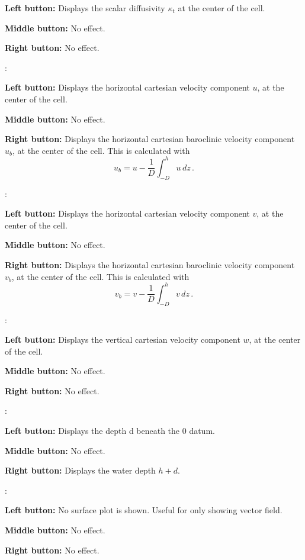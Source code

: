 \documentclass[12pt,oneside]{article}
\begin{document}
\begin{list}{}
\begin{list}{}
\item {\bf Left button:} Displays the scalar diffusivity $\kappa_t$ at the center of the cell.
\item {\bf Middle button:} No effect.
\item {\bf Right button:} No effect.
\end{list}
\item {}: 
\begin{list}{}
\item {\bf Left button:} Displays the horizontal cartesian velocity component $u$, at the center of the cell.
\item {\bf Middle button:} No effect.
\item {\bf Right button:} Displays the horizontal cartesian baroclinic velocity component $u_b$, at the center of the cell.
This is calculated with
\[
u_b = u - \frac{1}{D}\int_{-D}^h u\,dz\,.
\]
\end{list}
\item {}: 
\begin{list}{}
\item {\bf Left button:} Displays the horizontal cartesian velocity component $v$, at the center of the cell.
\item {\bf Middle button:} No effect.
\item {\bf Right button:} Displays the horizontal cartesian baroclinic velocity component $v_b$, at the center of the cell.
This is calculated with
\[
v_b = v - \frac{1}{D}\int_{-D}^h v\,dz\,.
\]
\end{list}
\item {}: 
\begin{list}{}
\item {\bf Left button:} Displays the vertical cartesian velocity component $w$, at the center of the cell.
\item {\bf Middle button:} No effect.
\item {\bf Right button:} No effect.
\end{list}
\item {}: 
\begin{list}{}
\item {\bf Left button:} Displays the depth d beneath the 0 datum.
\item {\bf Middle button:} No effect.
\item {\bf Right button:} Displays the water depth $h+d$.
\end{list}
\item {}: 
\begin{list}{}
\item {\bf Left button:} No surface plot is shown.  Useful for only showing vector field.
\item {\bf Middle button:} No effect.
\item {\bf Right button:} No effect.
\end{list}
\end{list}
\end{document}
